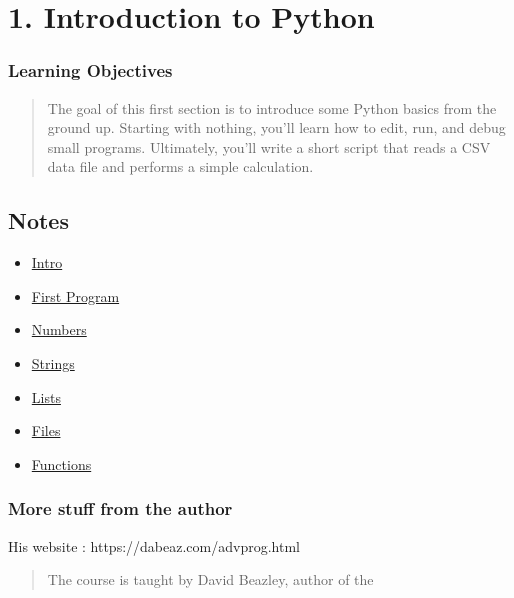 \documentclass[
  letterpaper,
  DIV=11,
  numbers=noendperiod]{scrreprt}
\begin{document}
\part{1. Introduction to Python}

\hypertarget{learning-objectives}{%
\section*{Learning Objectives}\label{learning-objectives}}

\begin{quote}
The goal of this first section is to introduce some Python basics from
the ground up. Starting with nothing, you'll learn how to edit, run, and
debug small programs. Ultimately, you'll write a short script that reads
a CSV data file and performs a simple calculation.
\end{quote}

\hypertarget{notes}{%
\chapter{Notes}\label{notes}}

\begin{itemize}
\item
  \protect\hyperlink{introducing-python}{Intro}
\item
  \protect\hyperlink{a-first-program}{First Program}
\item
  \protect\hyperlink{numbers}{Numbers}
\item
  \protect\hyperlink{strings}{Strings}
\item
  \protect\hyperlink{lists}{Lists}
\item
  \protect\hyperlink{file-management}{Files}
\item
  \protect\hyperlink{functions}{Functions}
\end{itemize}

\hypertarget{more-stuff-from-the-author}{%
\section{More stuff from the author}\label{more-stuff-from-the-author}}

His website : https://dabeaz.com/advprog.html

\begin{quote}
The course is taught by David Beazley, author of the
\end{quote}
\end{document}
